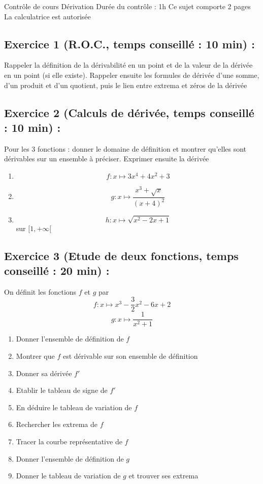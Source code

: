 


\center
\Large Contrôle de cours
\flushleft
\center
Dérivation
\flushleft \normalsize
Durée du contrôle : 1h\newline
Ce sujet comporte 2 pages\newline
La calculatrice est autorisée
\subsection*{Exercice 1 (R.O.C., temps conseillé : 10 min) : }
Rappeler la définition de la dérivabilité en un point et de la valeur de la dérivée en un point (si elle existe). Rappeler ensuite les formules de dérivée d'une somme, d'un produit et d'un quotient, puis le lien entre extrema et zéros de la dérivée
\subsection*{Exercice 2 (Calculs de dérivée, temps conseillé : 10 min) : }
Pour les 3 fonctions : donner le domaine de définition et montrer qu'elles sont dérivables sur un ensemble à préciser. Exprimer ensuite la dérivée
\begin{enumerate}
\item $$f:x\mapsto 3x^4+4x^2+3$$
\item $$g:x\mapsto \frac{x^3 + \sqrt{x}}{(x+4)^2}$$
\item $$h:x\mapsto \sqrt{x^2-2x+1}$$ sur $[1,+\infty[$
\end{enumerate}
\subsection*{Exercice 3 (Etude de deux fonctions, temps conseillé : 20 min) : }
On définit les fonctions $f$ et $g$ par
$$f:x\mapsto x^3 - \frac{3}{2}x^2 -6x +2$$
$$g:x \mapsto \frac{1}{x^2+1}$$
\begin{enumerate}
\item Donner l'ensemble de définition de $f$
\item Montrer que $f$ est dérivable sur son ensemble de définition
\item Donner sa dérivée $f'$
\item Etablir le tableau de signe de $f'$
\item En déduire le tableau de variation de $f$
\item Rechercher les extrema de $f$
\item Tracer la courbe représentative de $f$
\item Donner l'ensemble de définition de $g$
\item Donner le tableau de variation de $g$ et trouver ses extrema
\end{enumerate}
